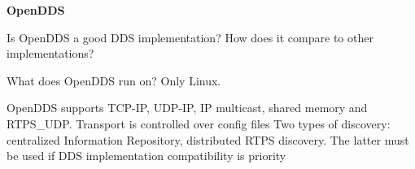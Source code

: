 \textbf{OpenDDS}

Is OpenDDS a good DDS implementation? How does it compare to other implementations?

What does OpenDDS run on? Only Linux.

OpenDDS supports TCP-IP, UDP-IP, IP multicast, shared memory and RTPS\_UDP. Transport is controlled over config files
Two types of discovery: centralized Information Repository, distributed RTPS discovery. The latter must be used if DDS implementation compatibility is priority
